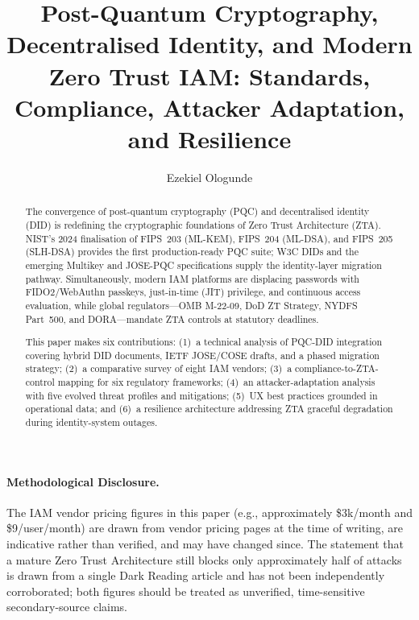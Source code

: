 \documentclass[sigconf,nonacm]{acmart}
\title{Post-Quantum Cryptography, Decentralised Identity, and Modern
Zero Trust IAM: Standards, Compliance, Attacker Adaptation, and
Resilience}
\author{Ezekiel Ologunde}
\affiliation{%
  \institution{Independent Researcher}
  \city{Boston}
  \state{MA}
  \country{USA}}
\begin{document}
\begin{abstract}
The convergence of post-quantum cryptography (PQC) and decentralised
identity (DID) is redefining the cryptographic foundations of Zero
Trust Architecture (ZTA).  NIST's 2024 finalisation of FIPS~203
(ML-KEM), FIPS~204 (ML-DSA), and FIPS~205 (SLH-DSA) provides the
first production-ready PQC suite; W3C DIDs and the emerging Multikey
and JOSE-PQC specifications supply the identity-layer migration
pathway.  Simultaneously, modern IAM platforms are displacing
passwords with FIDO2/WebAuthn passkeys, just-in-time (JIT) privilege,
and continuous access evaluation, while global regulators---OMB
M-22-09, DoD ZT Strategy, NYDFS Part~500, and DORA---mandate ZTA
controls at statutory deadlines.

This paper makes six contributions: (1)~a technical analysis of
PQC-DID integration covering hybrid DID documents, IETF JOSE/COSE
drafts, and a phased migration strategy; (2)~a comparative survey of
eight IAM vendors; (3)~a compliance-to-ZTA-control mapping for six
regulatory frameworks; (4)~an attacker-adaptation analysis with five
evolved threat profiles and mitigations; (5)~UX best practices grounded
in operational data; and (6)~a resilience architecture addressing ZTA
graceful degradation during identity-system outages.
\end{abstract}


\maketitle

\paragraph{Methodological Disclosure.} The IAM vendor pricing figures in this paper (e.g., approximately \$3k/month and \$9/user/month) are drawn from vendor pricing pages at the time of writing, are indicative rather than verified, and may have changed since. The statement that a mature Zero Trust Architecture still blocks only approximately half of attacks is drawn from a single Dark Reading article and has not been independently corroborated; both figures should be treated as unverified, time-sensitive secondary-source claims.

\end{document}
